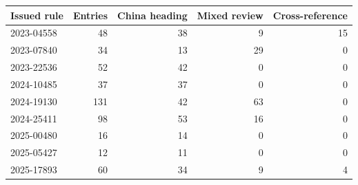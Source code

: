 \begin{tabular}{lrrrr}\toprule
Issued rule & Entries & China heading & Mixed review & Cross-reference \\\midrule
2023-04558 & 48 & 38 & 9 & 15 \\
2023-07840 & 34 & 13 & 29 & 0 \\
2023-22536 & 52 & 42 & 0 & 0 \\
2024-10485 & 37 & 37 & 0 & 0 \\
2024-19130 & 131 & 42 & 63 & 0 \\
2024-25411 & 98 & 53 & 16 & 0 \\
2025-00480 & 16 & 14 & 0 & 0 \\
2025-05427 & 12 & 11 & 0 & 0 \\
2025-17893 & 60 & 34 & 9 & 4 \\
\bottomrule\end{tabular}
